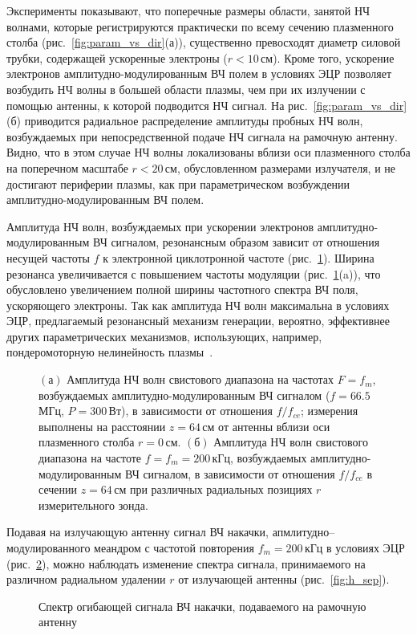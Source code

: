 \documentclass[10pt]{disser}
\begin{document}
Эксперименты показывают, что поперечные размеры области, занятой НЧ волнами, которые регистрируются практически по всему сечению плазменного столба (\mbox{рис.~\ref{fig:param_vs_dir}(а)}), существенно превосходят диаметр силовой трубки, содержащей ускоренные электроны ($r < 10$\,см). Кроме того, ускорение электронов амплитудно-мо\-ду\-ли\-ро\-ван\-ным ВЧ полем в условиях ЭЦР позволяет возбудить НЧ волны в большей области плазмы, чем при их излучении с помощью антенны, к которой подводится НЧ сигнал. На \mbox{рис.~\ref{fig:param_vs_dir}(б)} приводится радиальное распределение амплитуды пробных НЧ волн, возбуждаемых при непосредственной подаче НЧ сигнала на рамочную антенну. Видно, что в этом случае НЧ волны локализованы вблизи оси плазменного столба на поперечном масштабе $r < 20$\,см, обусловленном размерами излучателя, и не достигают периферии плазмы, как при параметрическом возбуждении амплитудно-модулированным ВЧ полем.   

Амплитуда НЧ волн, возбуждаемых при ускорении электронов ам\-пли\-ту\-дно-мо\-ду\-ли\-ро\-ван\-ным ВЧ сигналом, резонансным образом зависит от отношения несущей частоты $f$ к электронной циклотронной частоте (\mbox{рис.~\ref{fig:param_vs_dir_res}}). Ширина резонанса увеличивается с повышением частоты модуляции (\mbox{рис.~\ref{fig:param_vs_dir_res}(a)}), что обусловлено увеличением полной ширины частотного спектра ВЧ поля, ускоряющего электроны. Так как амплитуда НЧ волн максимальна в условиях ЭЦР, предлагаемый резонансный механизм генерации, вероятно, эффективнее других параметрических механизмов, использующих, например, пондеромоторную нелинейность плазмы~\cite{Gushchin}.
\begin{figure}[H]
  \centering
  \def\svgwidth{0.6\columnwidth} %
  
  \vspace{0.3cm}
  \caption{$(а)$ Амплитуда НЧ волн свистового диапазона на частотах $F=f_m$, возбуждаемых амплитудно-модулированным ВЧ сигналом ($f=66.5$\,МГц, $P=300$\,Вт), в зависимости от отношения $f/f_{ce}$; измерения выполнены на расстоянии $z=64$\,см от антенны вблизи оси плазменного столба $r=0$\,см. $(б)$ Амплитуда НЧ волн свистового диапазона на частоте $f=f_m=200$\,кГц, возбуждаемых амплитудно-модулированным ВЧ сигналом, в зависимости от отношения $f/f_{ce}$ в сечении $z=64$\,см при различных радиальных позициях $r$ измерительного зонда.}
  \label{fig:param_vs_dir_res}
\end{figure}

Подавая на излучающую антенну сигнал ВЧ накачки, апмлитудно--мо\-ду\-ли\-ро\-ван\-ного меандром с частотой повторения $f_m=200$\,кГц в условиях ЭЦР (\mbox{рис.~\ref{fig:h_sep_base}}), можно наблюдать изменение спектра сигнала, принимаемого на различном радиальном удалении $r$ от излучающей антенны (\mbox{рис.~\ref{fig:h_sep}}).
\begin{figure}[H]
    \centering
    \def\svgwidth{0.9\columnwidth} %
    
    \caption{Спектр огибающей сигнала ВЧ накачки, подаваемого на рамочную антенну}
    \label{fig:h_sep_base}
 \end{figure}
\end{document}
